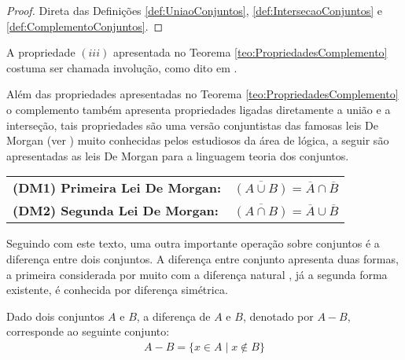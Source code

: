 \begin{proof}
	Direta das Definições \ref{def:UniaoConjuntos}, \ref{def:IntersecaoConjuntos} e \ref{def:ComplementoConjuntos}.
\end{proof}

\begin{nota}\label{note:Involucao}
  A propriedade $(iii)$ apresentada no Teorema \ref{teo:PropriedadesComplemento} costuma ser chamada involução, como dito em \cite{lipschutz1978-TC}.
\end{nota}

Além das propriedades apresentadas no Teorema \ref{teo:PropriedadesComplemento} o complemento também apresenta propriedades ligadas diretamente a união e a interseção, tais propriedades são uma versão conjuntistas das famosas leis De Morgan (ver \cite{carmo2013, joaoPavao2014, lipschutz2013-MD}) muito conhecidas pelos estudiosos da área de lógica, a seguir são apresentadas as leis De Morgan para a linguagem teoria dos conjuntos.

\begin{table*}[h]
	\centering
	\begin{tabular}{lc}
		\textbf{(DM1) Primeira Lei De Morgan:} & $\overline{(A \cup B)} = \overline{A} \cap \overline{B}$\\
		\textbf{(DM2) Segunda Lei De Morgan:} & $\overline{(A \cap B)} = \overline{A} \cup \overline{B}$\\
	\end{tabular}
\end{table*}

Seguindo com este texto, uma outra importante operação sobre conjuntos é a diferença entre dois conjuntos. A diferença entre conjunto apresenta duas formas, a primeira considerada por muito com a diferença natural \cite{carmo2013}, já a segunda forma existente, é conhecida por diferença simétrica. %

\begin{definicao}\label{def:DiferencaConjuntos}
	Dado dois conjuntos $A$ e $B$, a diferença de $A$ e $B$, denotado por $A - B$, corresponde ao seguinte conjunto:
  \begin{eqnarray*}
    A - B = \{x \in A \mid x \notin B\}
  \end{eqnarray*}
\end{definicao}

